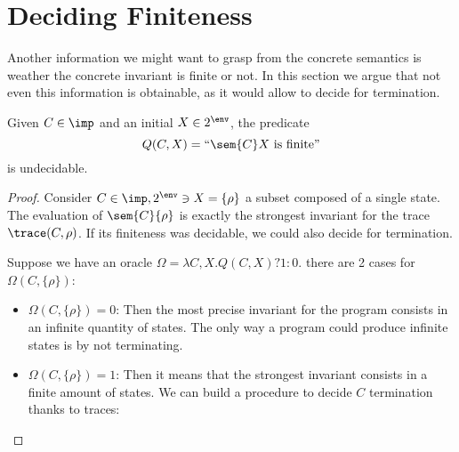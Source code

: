 \section{Deciding Finiteness}

Another information we might want to grasp from the concrete semantics
is weather the concrete invariant is finite or not. In this section we
argue that not even this information is obtainable, as it would allow
to decide for termination.

\begin{theorem}
  Given \(C\in\imp\) and an initial \(X \in 2^\env\), the
  predicate \[Q(C,X)= ``\sem{C}X \text{ is finite}" \] is
  undecidable.
\end{theorem}

\begin{proof}
  Consider \(C\in\imp, 2^\env \ni X = \{\rho\}\) a subset composed of
  a single state. The evaluation of \(\sem{C}\{\rho\}\) is exactly the
  strongest invariant for the trace \(\trace(C,\rho)\). If its
  finiteness was decidable, we could also decide for termination.

  Suppose we have an oracle \(\Omega = \lambda C , X . Q(C,X) ? 1 :
  0\). there are 2 cases for \(\Omega(C,\{\rho\})\):
  \begin{itemize}
  \item \(\Omega(C,\{\rho\}) = 0\): Then the most precise invariant
    for the program consists in an infinite quantity of states. The
    only way a program could produce infinite states is by not
    terminating.
  \item \(\Omega(C,\{\rho\}) = 1\): Then it means that the strongest
    invariant consists in a finite amount of states. We can build a
    procedure to decide \(C\) termination thanks to traces:
  \end{itemize}
\end{proof}
